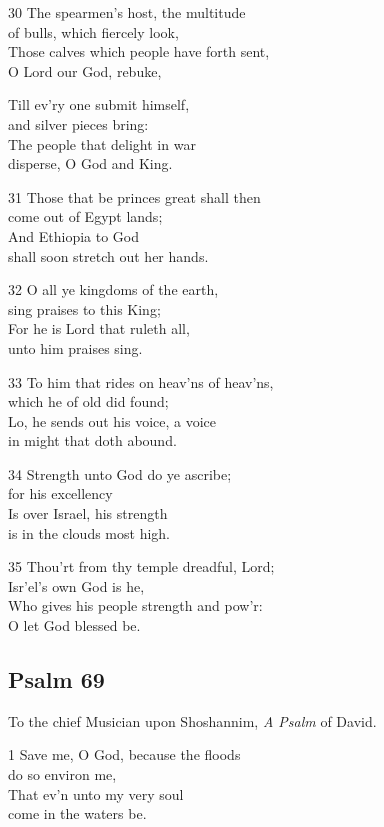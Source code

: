\begin{multicols}{3}
30 The spearmen’s host, the multitude\\
of bulls, which fiercely look,\\
Those calves which people have forth sent,\\
O Lord our God, rebuke,

Till ev’ry one submit himself,\\
and silver pieces bring:\\
The people that delight in war\\
disperse, O God and King.

31 Those that be princes great shall then\\
come out of Egypt lands;\\
And Ethiopia to God\\
shall soon stretch out her hands.

32 O all ye kingdoms of the earth,\\
sing praises to this King;\\
For he is Lord that ruleth all,\\
unto him praises sing.

33 To him that rides on heav’ns of heav’ns,\\
which he of old did found;\\
Lo, he sends out his voice, a voice\\
in might that doth abound.

34 Strength unto God do ye ascribe;\\
for his excellency\\
Is over Israel, his strength\\
is in the clouds most high.

35 Thou’rt from thy temple dreadful, Lord;\\
Isr’el’s own God is he,\\
Who gives his people strength and pow’r:\\
O let God blessed be.

\begin{center}
\quad{}\quad{}
\end{center}
\subsection*{Psalm 69}

To the chief Musician upon Shoshannim,
\emph{A Psalm} of David.

1 Save me, O God, because the floods\\
do so environ me,\\
That ev’n unto my very soul\\
come in the waters be.


\end{multicols}
